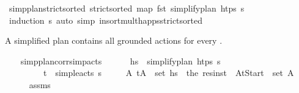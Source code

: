 \begin{isabellebody}
\ simp{\isacharunderscore}{\kern0pt}plan{\isacharunderscore}{\kern0pt}strict{\isacharunderscore}{\kern0pt}sorted{\isacharcolon}{\kern0pt}\ {\isachardoublequoteopen}strict{\isacharunderscore}{\kern0pt}sorted\ {\isacharparenleft}{\kern0pt}map\ fst\ {\isacharparenleft}{\kern0pt}simplify{\isacharunderscore}{\kern0pt}plan\ htps\ {\isasympi}s{\isacharparenright}{\kern0pt}{\isacharparenright}{\kern0pt}{\isachardoublequoteclose}\isanewline
%
\isadelimproof
\ \ \ \ %
\endisadelimproof
%
\isatagproof
{}\isamarkupfalse%
\ {\isacharparenleft}{\kern0pt}induction\ {\isasympi}s{\isacharparenright}{\kern0pt}\ {\isacharparenleft}{\kern0pt}auto\ simp{\isacharcolon}{\kern0pt}\ insort{\isacharunderscore}{\kern0pt}mult{\isacharunderscore}{\kern0pt}happs{\isacharunderscore}{\kern0pt}strict{\isacharunderscore}{\kern0pt}sorted{\isacharparenright}{\kern0pt}%
\endisatagproof
{\isafoldproof}%
%
\isadelimproof
%
\endisadelimproof
%
\begin{isamarkuptext}%
A simplified plan contains all grounded actions for every .%
\end{isamarkuptext}\isamarkuptrue%
\ \ \isamarkupfalse%
\ simp{\isacharunderscore}{\kern0pt}plan{\isacharunderscore}{\kern0pt}corr{\isacharunderscore}{\kern0pt}simp{\isacharunderscore}{\kern0pt}acts{\isacharcolon}{\kern0pt}\ \isanewline
\ \ \ \ \ {\isachardoublequoteopen}hs\ {\isacharequal}{\kern0pt}\ simplify{\isacharunderscore}{\kern0pt}plan\ htps\ {\isasympi}s{\isachardoublequoteclose}\ \isanewline
\ \ \ \ \ \ \ \ \ {\isachardoublequoteopen}{\isacharparenleft}{\kern0pt}t\isactrlsub {\isasympi}{\isacharcomma}{\kern0pt}{\isasympi}{\isacharparenright}{\kern0pt}\ {\isasymin}\ simple{\isacharunderscore}{\kern0pt}acts\ {\isasympi}s{\isachardoublequoteclose}\isanewline
\ \ \ \ \ {\isachardoublequoteopen}{\isasymexists}A{\isachardot}{\kern0pt}\ {\isacharparenleft}{\kern0pt}t\isactrlsub {\isasympi}{\isacharcomma}{\kern0pt}A{\isacharparenright}{\kern0pt}\ {\isasymin}\ set\ hs\ {\isasymand}\ the\ {\isacharparenleft}{\kern0pt}res{\isacharunderscore}{\kern0pt}inst\ {\isasympi}\ At{\isacharunderscore}{\kern0pt}Start{\isacharparenright}{\kern0pt}\ {\isasymin}\ set\ A{\isachardoublequoteclose}\isanewline
%
\isadelimproof
\ \ \ \ %
\endisadelimproof
%
\isatagproof
{}\isamarkupfalse%
\ assms\isanewline
\ \ \isamarkupfalse%
\ {\isacharminus}{\kern0pt}\isanewline
\ \ \ \ \isamarkupfalse%

\end{isabellebody}
